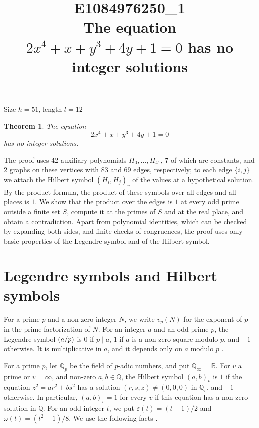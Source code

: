 \documentclass[11pt]{article}
\title{\textbf{E1084976250\_1}\\[4pt] {\Large The equation $2x^{4}+x+y^{3}+4y+1=0$ has no integer solutions}}
\author{}
\date{}
\newtheorem{theorem}{Theorem}
\newcommand{\Q}{\mathbb{Q}}
\newcommand{\leg}[2]{\mathchoice{\biggl(\dfrac{#1}{#2}\biggr)}{(#1/#2)}{(#1/#2)}{(#1/#2)}}
\begin{document}
\maketitle
\vspace{-8ex}
\begin{center}
Size $h=51$, length $l=12$
\end{center}

\begin{theorem}\label{thm:main}
The equation
\begin{equation}\label{eq:main}
2x^{4}+x+y^{3}+4y+1=0
\end{equation}
has no integer solutions.
\end{theorem}

The proof uses 42 auxiliary polynomials $H_0,\dots,H_{41}$, 7 of which are constants, and 2 graphs on these vertices with 83 and 69 edges, respectively; to each edge $\{i,j\}$ we attach the Hilbert symbol $(H_i,H_j)_v$ of the values at a hypothetical solution. By the product formula, the product of these symbols over all edges and all places is $1$. We show that the product over the edges is $1$ at every odd prime outside a finite set $S$, compute it at the primes of $S$ and at the real place, and obtain a contradiction. Apart from polynomial identities, which can be checked by expanding both sides, and finite checks of congruences, the proof uses only basic properties of the Legendre symbol and of the Hilbert symbol.

\section{Legendre symbols and Hilbert symbols}

For a prime $p$ and a non-zero integer $N$, we write $v_p(N)$ for the exponent of $p$ in the prime factorization of $N$. For an integer $a$ and an odd prime $p$, the Legendre symbol $\leg{a}{p}$ is $0$ if $p\mid a$, $1$ if $a$ is a non-zero square modulo $p$, and $-1$ otherwise. It is multiplicative in $a$, and it depends only on $a$ modulo $p$ \cite[Chapter~5]{IR}.

For a prime $p$, let $\Q_p$ be the field of $p$-adic numbers, and put $\Q_\infty=\mathbb R$. For $v$ a prime or $v=\infty$, and non-zero $a,b\in\Q$, the Hilbert symbol $(a,b)_v$ is $1$ if the equation $z^2=ar^2+bs^2$ has a solution $(r,s,z)\neq(0,0,0)$ in $\Q_v$, and $-1$ otherwise. In particular, $(a,b)_v=1$ for every $v$ if this equation has a non-zero solution in $\Q$. For an odd integer $t$, we put $\varepsilon(t)=(t-1)/2$ and $\omega(t)=(t^2-1)/8$. We use the following facts \cite[Chapter~III, Proposition~2 and Theorems~1 and~3]{Se}.
\end{document}
